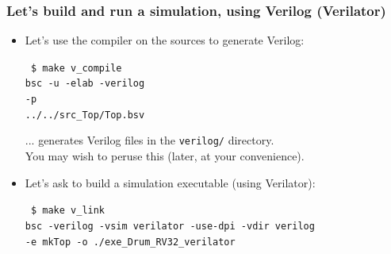 \begin{frame}[fragile]
\frametitle{Let's build and run a {\DRUM} simulation, using Verilog (Verilator)}

\begin{center}\scriptsize


 \vspace*{2ex}

 \begin{minipage}{0.8\textwidth}
  \begin{itemize}

   \item Let's use the {\bsc} compiler on the {\BSV} sources to generate Verilog:

   \hmm\begin{minipage}{0.8\textwidth}\tiny
     \begin{tabbing}\tt
       \$ make v\_compile \\
       bsc -u -elab -verilog   \\
       \hmm -p    \\
       \hmm ../../src\_Top/Top.bsv
     \end{tabbing}
   \end{minipage}

   \vspace*{1ex}

   ... generates Verilog files in the {\tt verilog/} directory. \\
   You may wish to peruse this (later, at your convenience).

   \item Let's ask {\bsc} to build a simulation executable (using Verilator):

   \hmm\begin{minipage}{0.8\textwidth}\tiny
     \begin{tabbing}\tt
       \$ make v\_link \\
       bsc -verilog  -vsim verilator  -use-dpi  -vdir verilog  \\
       \hmm -e mkTop -o ./exe\_Drum\_RV32\_verilator \\
       \hmm  {} \\
     \end{tabbing}
   \end{minipage}


\end{itemize}
\end{minipage}
\end{center}
\end{frame}
